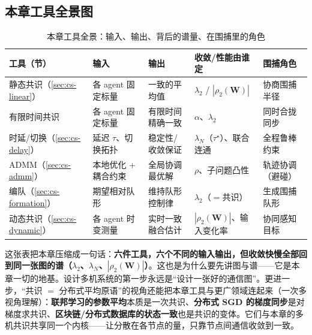 \subsection{本章工具全景图}
\label{sec:cs-tools-overview}

\begin{table}[H]\centering\small
\caption{本章工具全景：输入、输出、背后的谱量、在围捕里的角色}
\label{tab:cs-tools}
\begin{tabular}{p{2.4cm}p{2.6cm}p{2.6cm}p{2.8cm}p{2.2cm}}
\toprule
工具（节） & 输入 & 输出 & 收敛/性能由谁定 & 围捕角色 \\
\midrule
静态共识（\cref{sec:cs-linear}） & 各 agent 固定标量 & 一致的平均值 & $\lambda_2$ / $|\rho_2(\mathbf{W})|$ & 协商围捕半径 \\
有限时间共识 & 各 agent 固定标量 & 有限时间精确一致 & $\alpha$、$\lambda_2$ & 同时合拢同步 \\
时延/切换（\cref{sec:cs-delay}） & 延迟 $\tau$、切换拓扑 & 稳定性/收敛保证 & $\lambda_N$（$\tau^\star$）、联合连通 & 全程鲁棒约束 \\
ADMM（\cref{sec:cs-admm}） & 本地优化 + 耦合约束 & 全局协调最优解 & $\rho$、子问题凸性 & 轨迹协调（避碰） \\
编队（\cref{sec:cs-formation}） & 期望相对队形 & 维持队形控制律 & $\lambda_2$（$=$共识） & 生成围捕队形 \\
动态共识（\cref{sec:cs-dynamic}） & 各 agent 时变测量 & 实时一致融合估计 & $|\rho_2(\mathbf{W})|$、输入变化率 & 协同感知目标 \\
\bottomrule
\end{tabular}
\end{table}

\noindent 这张表把本章压缩成一句话：\textbf{六件工具，六个不同的输入输出，但收敛快慢全部回到同一张图的谱（$\lambda_2$、$\lambda_N$、$|\rho_2(\mathbf{W})|$）}。这也是为什么要先讲图与谱——它是本章一切的地基。设计多机系统的第一步永远是“设计一张好的通信图”。更进一步，“共识 $=$ 分布式平均原语”的视角还能把本章工具与更广领域连起来（一次多视角理解）：\textbf{联邦学习的参数平均}本质是一次共识、\textbf{分布式 SGD 的梯度同步}是对梯度求共识、\textbf{区块链/分布式数据库的状态一致}也是共识的变体。它们与本章的多机共识共享同一个内核——让分散在各节点的量，只靠节点间通信收敛到一致。

